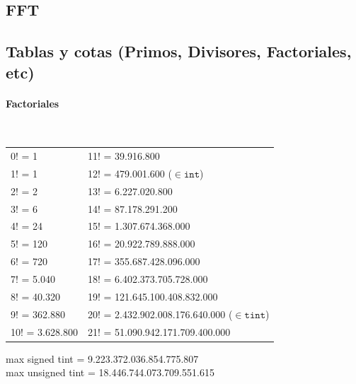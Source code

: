 \subsection{FFT}
\subsection{Tablas y cotas (Primos, Divisores, Factoriales, etc)}
\paragraph{Factoriales} \ \\
\begin{tabular}{l|l}
0! =	1             & 11! = 39.916.800  \\
1! =	1             & 12! =	479.001.600	($\in \mathtt{int}$)\\
2! =	2             & 13! =	6.227.020.800	\\
3! =	6             & 14! =	87.178.291.200	\\
4! =	24            & 15! =	1.307.674.368.000	\\
5! =	120   			  & 16! =	20.922.789.888.000	\\
6! =	720           & 17! =	355.687.428.096.000	\\
7! =	5.040	        & 18! =	6.402.373.705.728.000	\\
8! =	40.320	      & 19! =	121.645.100.408.832.000	\\
9! =	362.880       & 20! =	2.432.902.008.176.640.000	($\in \mathtt{tint}$) \\
10! =	3.628.800     & 21! =	51.090.942.171.709.400.000
\end{tabular}
 
max signed tint = 9.223.372.036.854.775.807 \\
max unsigned tint = 18.446.744.073.709.551.615
